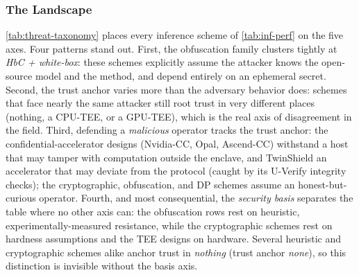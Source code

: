 \subsubsection{The Landscape}
\label{sec:threat-landscape}

\cref{tab:threat-taxonomy} places every inference scheme of \cref{tab:inf-perf} on
the five axes. Four patterns stand out. First, the
obfuscation family clusters tightly at \emph{HbC + white-box}: these schemes
explicitly assume the attacker knows the open-source model and the method, and
depend entirely on an ephemeral secret. Second, the trust anchor varies more
than the adversary behavior does: schemes that face nearly the same attacker still
root trust in very different places (nothing, a CPU-TEE, or a GPU-TEE), which is the real
axis of disagreement in the field. Third, defending a \emph{malicious} operator tracks the
trust anchor: the confidential-accelerator designs (Nvidia-CC, Opal, Ascend-CC) withstand a host
that may tamper with computation outside the enclave, and TwinShield an accelerator that may
deviate from the protocol (caught by its U-Verify integrity checks); the cryptographic,
obfuscation, and DP schemes assume an honest-but-curious operator. Fourth, and most consequential, the \emph{security basis} separates the
table where no other axis can: the obfuscation rows rest on heuristic,
experimentally-measured resistance, while the cryptographic
schemes rest on hardness assumptions and the TEE designs on hardware. Several
heuristic and cryptographic schemes alike anchor trust in \emph{nothing}
(trust anchor \emph{none}), so this distinction is invisible without the basis
axis.

